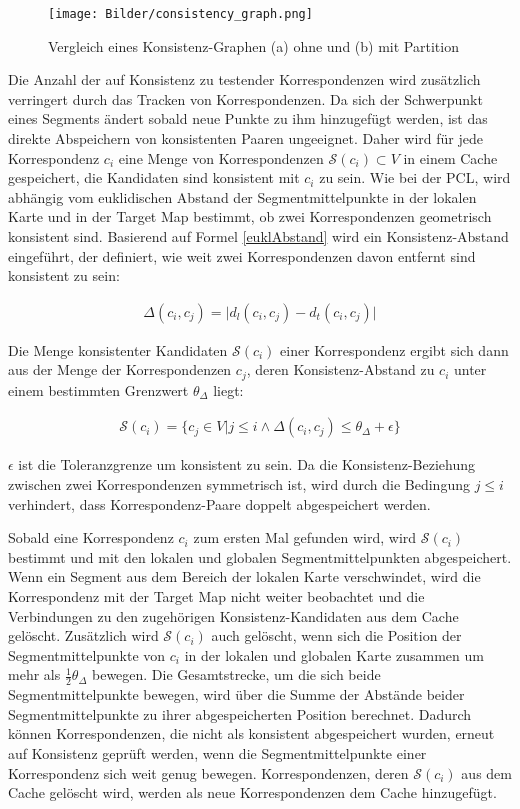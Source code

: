 \begin{figure}
    \centering
    \texttt{[image: Bilder/consistency\_graph.png]}
    \caption{Vergleich eines Konsistenz-Graphen (a) ohne und (b) mit Partition \cite{Dube2018}}
    \label{fig:graph}
\end{figure}

Die Anzahl der auf Konsistenz zu testender Korrespondenzen wird zusätzlich verringert durch das Tracken von Korrespondenzen. Da sich der Schwerpunkt eines Segments ändert sobald neue Punkte zu ihm hinzugefügt werden, ist das direkte Ab\-spei\-chern von konsistenten Paaren ungeeignet. Daher wird für jede Korrespondenz $ c_i $ eine Menge von Korrespondenzen $ \mathcal{S}(c_i) \subset V $ in einem Cache gespeichert, die Kandidaten sind konsistent mit $ c_i $ zu sein. Wie bei der PCL, wird abhängig vom euklidischen Abstand der Segmentmittelpunkte in der lokalen Karte und in der Target Map bestimmt, ob zwei Korrespondenzen geometrisch konsistent sind. Basierend auf Formel \ref{euklAbstand} wird ein Konsistenz-Abstand eingeführt, der definiert, wie weit zwei Korrespondenzen davon entfernt sind konsistent zu sein:  

\begin{align}
	\Delta (c_i,c_j) = \vert d_l(c_i,c_j) - d_t(c_i,c_j)\vert
\end{align}

Die Menge konsistenter Kandidaten $ \mathcal{S}(c_i) $ einer Korrespondenz  ergibt sich dann aus der Menge der Korrespondenzen $ c_j $, deren Konsistenz-Abstand zu $ c_i $ unter einem bestimmten Grenzwert $ \theta _\Delta $ liegt: 

\begin{align}
	\mathcal{S}(c_i) = \{c_j \in V \vert j \leq i \wedge \Delta (c_i,c_j) \leq \theta _\Delta + \epsilon \}
\end{align}

$ \epsilon $ ist die Toleranzgrenze um konsistent zu sein. Da die Konsistenz-Beziehung zwischen zwei Korrespondenzen symmetrisch ist, wird durch die Bedingung $ j \leq i $ verhindert, dass Korrespondenz-Paare doppelt abgespeichert werden. 

Sobald eine Korrespondenz $ c_i $ zum ersten Mal gefunden wird, wird $ \mathcal{S}(c_i) $ bestimmt und mit den lokalen und globalen Segmentmittelpunkten abgespeichert. Wenn ein Segment aus dem Bereich der lokalen Karte verschwindet, wird die Korrespondenz mit der Target Map nicht weiter beobachtet und die Verbindungen zu den zugehörigen Konsistenz-Kandidaten aus dem Cache gelöscht. Zusätzlich wird $ \mathcal{S}(c_i) $ auch gelöscht, wenn sich die Position der Segmentmittelpunkte von $ c_i $ in der lokalen und globalen Karte zusammen um mehr als $ \frac{1}{2}\theta _\Delta $ bewegen. Die Gesamtstrecke, um die sich beide Segmentmittelpunkte bewegen, wird über die Summe der Abstände beider Segmentmittelpunkte zu ihrer abgespeicherten Position berechnet. Dadurch können Korrespondenzen, die nicht als konsistent abgespeichert wurden, erneut auf Konsistenz geprüft werden, wenn die Segmentmittelpunkte einer Korrespondenz sich weit genug bewegen. Korrespondenzen, deren $ \mathcal{S}(c_i) $ aus dem Cache gelöscht wird, werden als neue Korrespondenzen dem Cache hinzugefügt. 

